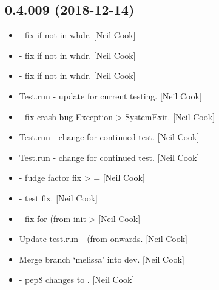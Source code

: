 \documentclass[a4paper,10pt,english]{report}
\begin{document}
\subsection{0.4.009 (2018-12-14)}
\label{\detokenize{misc/changelog:id232}}\begin{itemize}
\item {} 
 - fix if  not in whdr. {[}Neil Cook{]}

\item {} 
 - fix if  not in whdr. {[}Neil Cook{]}

\item {} 
 - fix if  not in whdr. {[}Neil Cook{]}

\item {} 
Test.run - update for current testing. {[}Neil Cook{]}

\item {} 
 - fix crash bug Exception \textendash{}\textgreater{} SystemExit.
{[}Neil Cook{]}

\item {} 
Test.run - change for continued test. {[}Neil Cook{]}

\item {} 
Test.run - change for continued test. {[}Neil Cook{]}

\item {} 
 - fudge factor fix \textendash{}\textgreater{}  =
 {[}Neil Cook{]}

\item {} 
 - test fix. {[}Neil Cook{]}

\item {} 
 - fix for  (from init \textendash{}\textgreater{} 
{[}Neil Cook{]}

\item {} 
Update test.run -  (from  onwards. {[}Neil Cook{]}

\item {} 
Merge branch ‘melissa’ into dev. {[}Neil Cook{]}

\item {} 
 - pep8 changes to . {[}Neil Cook{]}


\end{itemize}
\end{document}
